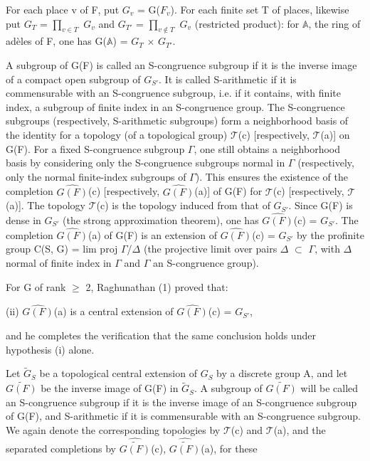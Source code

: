 \documentclass[10pt,a4paper]{article}
\begin{document}
\smallskip
\noindent For each place v of F, put \ensuremath{G_v} = G(\ensuremath{F_v}). For each finite set T of places, likewise put \ensuremath{G_T} = \ensuremath{∏_{v∈T}} \ensuremath{G_v} and \ensuremath{G_{T′}} = \ensuremath{∏_{v∉T}} \ensuremath{G_v} (restricted product): for \ensuremath{𝔸}, the ring of adèles of F, one has G(\ensuremath{𝔸}) = \ensuremath{G_T} \ensuremath{×} \ensuremath{G_{T′}}.\par
\smallskip
\noindent A subgroup of G(F) is called an S-congruence subgroup if it is the inverse image of a compact open subgroup of \ensuremath{G_{S′}}. It is called S-arithmetic if it is commensurable with an S-congruence subgroup, i.e. if it contains, with finite index, a subgroup of finite index in an S-congruence group. The S-congruence subgroups (respectively, S-arithmetic subgroups) form a neighborhood basis of the identity for a topology (of a topological group) \ensuremath{𝒯}(c) [respectively, \ensuremath{𝒯}(a)] on G(F). For a fixed S-congruence subgroup \ensuremath{Γ}, one still obtains a neighborhood basis by considering only the S-congruence subgroups normal in \ensuremath{Γ} (respectively, only the normal finite-index subgroups of \ensuremath{Γ}). This ensures the existence of the completion \ensuremath{\widehat{G(F)}}(c) [respectively, \ensuremath{\widehat{G(F)}}(a)] of G(F) for \ensuremath{𝒯}(c) [respectively, \ensuremath{𝒯}(a)]. The topology \ensuremath{𝒯}(c) is the topology induced from that of \ensuremath{G_{S′}}. Since G(F) is dense in \ensuremath{G_{S′}} (the strong approximation theorem), one has \ensuremath{\widehat{G(F)}}(c) = \ensuremath{G_{S′}}. The completion \ensuremath{\widehat{G(F)}}(a) of G(F) is an extension of \ensuremath{\widehat{G(F)}}(c) = \ensuremath{G_{S′}} by the profinite group C(S, G) = lim proj \ensuremath{Γ}/\ensuremath{Δ} (the projective limit over pairs \ensuremath{Δ} \ensuremath{⊂} \ensuremath{Γ}, with \ensuremath{Δ} normal of finite index in \ensuremath{Γ} and \ensuremath{Γ} an S-congruence group).\par
\smallskip
\noindent For G of rank \ensuremath{≥} 2, Raghunathan (1) proved that:\par
\smallskip
\noindent (ii)    \ensuremath{\widehat{G(F)}}(a) is a central extension of \ensuremath{\widehat{G(F)}}(c) = \ensuremath{G_{S′}},\par
\smallskip
\noindent and he completes the verification that the same conclusion holds under hypothesis (i) alone.\par
\smallskip
\noindent Let \ensuremath{\widetilde{G}_S} be a topological central extension of \ensuremath{G_S} by a discrete group A, and let \ensuremath{\widetilde{G(F)}} be the inverse image of G(F) in \ensuremath{\widetilde{G}_S}. A subgroup of \ensuremath{\widetilde{G(F)}} will be called an S-congruence subgroup if it is the inverse image of an S-congruence subgroup of G(F), and S-arithmetic if it is commensurable with an S-congruence subgroup. We again denote the corresponding topologies by \ensuremath{𝒯}(c) and \ensuremath{𝒯}(a), and the separated completions by \ensuremath{\widehat{\widetilde{G(F)}}}(c), \ensuremath{\widehat{\widetilde{G(F)}}}(a), for these\par
\clearpage
{}\hypertarget{authority-page-0002}{}
\end{document}
